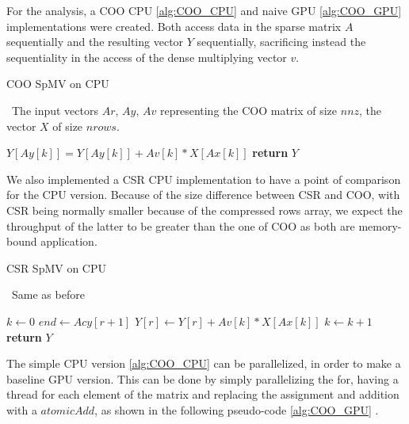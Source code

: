 \documentclass[conference]{IEEEtran}
\begin{document}

For the analysis, a COO CPU \ref{alg:COO_CPU} and  naive GPU \ref{alg:COO_GPU} implementations were created. Both access data in the sparse matrix $A$ sequentially and the resulting vector $Y$ sequentially, sacrificing instead the sequentiality in the access of the dense multiplying vector $v$.

\begin{algorithm}[h!]
	\caption{COO SpMV on CPU}
	\algorithmicrequire~The input vectors $Ar$, $Ay$, $Av$ representing the COO matrix of size $nnz$, the vector $X$ of size $nrows$.
	\begin{algorithmic}[1]
		\State $Y[Ay[k]] = Y[Ay[k]] + Av[k] * X[Ax[k]] $\label{partitioning}
		\EndFor
		\State \textbf{return} $Y$
		\EndProcedure
	\end{algorithmic}
	\label{alg:COO_CPU}
\end{algorithm}

We also implemented a CSR CPU implementation to have a point of comparison for the CPU version. Because of the size difference between CSR and COO, with CSR being normally smaller because of the compressed rows array, we expect the throughput of the latter to be greater than the one of COO as both are memory-bound application.

\begin{algorithm}[h!]
	\caption{CSR SpMV on CPU}
	\algorithmicrequire~Same as before
	\begin{algorithmic}[1]

		\State $k \leftarrow 0$
		\State $end \leftarrow Acy[r + 1]$
		\State $Y[r] \leftarrow Y[r] + Av[k] * X[Ax[k]] $\label{partitioning}
		\State $k \leftarrow k + 1$
		\EndWhile
		\EndFor
		\State \textbf{return} $Y$
		\EndProcedure
	\end{algorithmic}
	\label{alg:CSR_CPU}
\end{algorithm}
The simple CPU version \ref{alg:COO_CPU} can be parallelized, in order to make a baseline GPU version. This can be done by simply parallelizing the for, having a thread for each element of the matrix and replacing the assignment and addition with a $atomicAdd$, as shown in the following pseudo-code \ref{alg:COO_GPU} .
\end{document}
